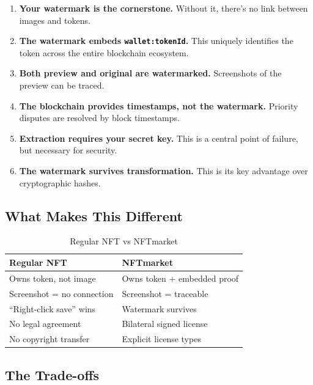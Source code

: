 \documentclass[11pt,a4paper]{article}
\newcommand{\code}[1]{\texttt{#1}}
\begin{document}
\begin{enumerate}
    \item \textbf{Your watermark is the cornerstone.} Without it, there's no link between images and tokens.

    \item \textbf{The watermark embeds \code{wallet:tokenId}.} This uniquely identifies the token across the entire blockchain ecosystem.

    \item \textbf{Both preview and original are watermarked.} Screenshots of the preview can be traced.

    \item \textbf{The blockchain provides timestamps, not the watermark.} Priority disputes are resolved by block timestamps.

    \item \textbf{Extraction requires your secret key.} This is a central point of failure, but necessary for security.

    \item \textbf{The watermark survives transformation.} This is its key advantage over cryptographic hashes.
\end{enumerate}

\subsection*{What Makes This Different}

\begin{table}[h]
\centering
\begin{tabular}{@{}L{6cm}L{6cm}@{}}
\toprule
\textbf{Regular NFT} & \textbf{NFTmarket} \\
\midrule
Owns token, not image & Owns token + embedded proof \\
Screenshot = no connection & Screenshot = traceable \\
``Right-click save'' wins & Watermark survives \\
No legal agreement & Bilateral signed license \\
No copyright transfer & Explicit license types \\
\bottomrule
\end{tabular}
\caption{Regular NFT vs NFTmarket}
\end{table}

\subsection*{The Trade-offs}
\end{document}
